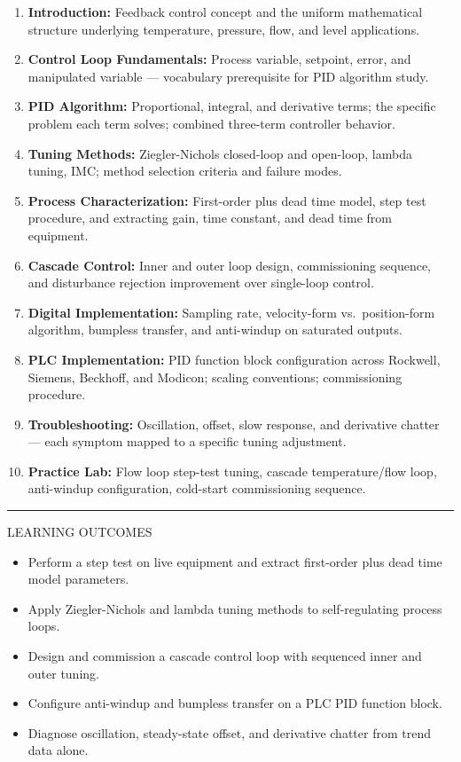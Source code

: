 \documentclass[10pt]{article}
\begin{document}
\begin{enumerate}\small
  \item \textbf{Introduction:} Feedback control concept and the uniform mathematical structure underlying temperature, pressure, flow, and level applications.
  \item \textbf{Control Loop Fundamentals:} Process variable, setpoint, error, and manipulated variable — vocabulary prerequisite for PID algorithm study.
  \item \textbf{PID Algorithm:} Proportional, integral, and derivative terms; the specific problem each term solves; combined three-term controller behavior.
  \item \textbf{Tuning Methods:} Ziegler-Nichols closed-loop and open-loop, lambda tuning, IMC; method selection criteria and failure modes.
  \item \textbf{Process Characterization:} First-order plus dead time model, step test procedure, and extracting gain, time constant, and dead time from equipment.
  \item \textbf{Cascade Control:} Inner and outer loop design, commissioning sequence, and disturbance rejection improvement over single-loop control.
  \item \textbf{Digital Implementation:} Sampling rate, velocity-form vs.\ position-form algorithm, bumpless transfer, and anti-windup on saturated outputs.
  \item \textbf{PLC Implementation:} PID function block configuration across Rockwell, Siemens, Beckhoff, and Modicon; scaling conventions; commissioning procedure.
  \item \textbf{Troubleshooting:} Oscillation, offset, slow response, and derivative chatter — each symptom mapped to a specific tuning adjustment.
  \item \textbf{Practice Lab:} Flow loop step-test tuning, cascade temperature/flow loop, anti-windup configuration, cold-start commissioning sequence.
\end{enumerate}

\smallskip
{\color{pnavy}\rule{\linewidth}{0.4pt}}
\smallskip
{\small\sffamily\color{pgray}\MakeUppercase{Learning Outcomes}}
\smallskip

\begin{itemize}\small
  \item Perform a step test on live equipment and extract first-order plus dead time model parameters.
  \item Apply Ziegler-Nichols and lambda tuning methods to self-regulating process loops.
  \item Design and commission a cascade control loop with sequenced inner and outer tuning.
  \item Configure anti-windup and bumpless transfer on a PLC PID function block.
  \item Diagnose oscillation, steady-state offset, and derivative chatter from trend data alone.
\end{itemize}
\end{document}
